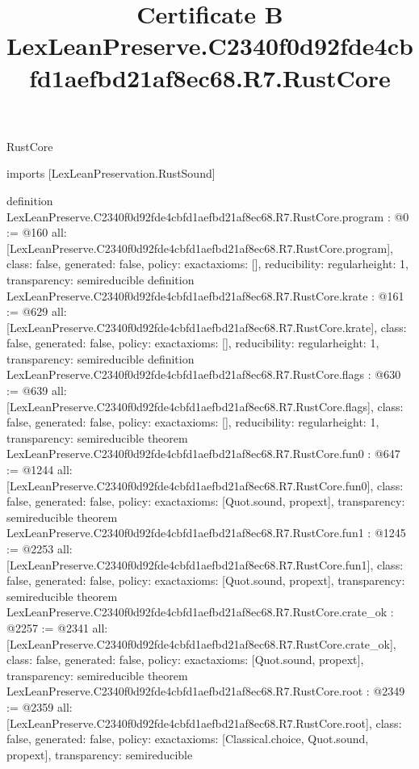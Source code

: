 \begin{lexlean}{RustCore}
\title{Certificate B LexLeanPreserve.C2340f0d92fde4cbfd1aefbd21af8ec68.R7.RustCore}
\begin{coremodule}
imports [LexLeanPreservation.RustSound]

definition LexLeanPreserve.C2340f0d92fde4cbfd1aefbd21af8ec68.R7.RustCore.program : @0 := @160 {
  all: [LexLeanPreserve.C2340f0d92fde4cbfd1aefbd21af8ec68.R7.RustCore.program],
  class: false,
  generated: false,
  policy: exact{axioms: []},
  reducibility: regular{height: 1},
  transparency: semireducible
}
definition LexLeanPreserve.C2340f0d92fde4cbfd1aefbd21af8ec68.R7.RustCore.krate : @161 := @629 {
  all: [LexLeanPreserve.C2340f0d92fde4cbfd1aefbd21af8ec68.R7.RustCore.krate],
  class: false,
  generated: false,
  policy: exact{axioms: []},
  reducibility: regular{height: 1},
  transparency: semireducible
}
definition LexLeanPreserve.C2340f0d92fde4cbfd1aefbd21af8ec68.R7.RustCore.flags : @630 := @639 {
  all: [LexLeanPreserve.C2340f0d92fde4cbfd1aefbd21af8ec68.R7.RustCore.flags],
  class: false,
  generated: false,
  policy: exact{axioms: []},
  reducibility: regular{height: 1},
  transparency: semireducible
}
theorem LexLeanPreserve.C2340f0d92fde4cbfd1aefbd21af8ec68.R7.RustCore.fun0 : @647 := @1244 {
  all: [LexLeanPreserve.C2340f0d92fde4cbfd1aefbd21af8ec68.R7.RustCore.fun0],
  class: false,
  generated: false,
  policy: exact{axioms: [Quot.sound, propext]},
  transparency: semireducible
}
theorem LexLeanPreserve.C2340f0d92fde4cbfd1aefbd21af8ec68.R7.RustCore.fun1 : @1245 := @2253 {
  all: [LexLeanPreserve.C2340f0d92fde4cbfd1aefbd21af8ec68.R7.RustCore.fun1],
  class: false,
  generated: false,
  policy: exact{axioms: [Quot.sound, propext]},
  transparency: semireducible
}
theorem LexLeanPreserve.C2340f0d92fde4cbfd1aefbd21af8ec68.R7.RustCore.crate_ok : @2257 := @2341 {
  all: [LexLeanPreserve.C2340f0d92fde4cbfd1aefbd21af8ec68.R7.RustCore.crate_ok],
  class: false,
  generated: false,
  policy: exact{axioms: [Quot.sound, propext]},
  transparency: semireducible
}
theorem LexLeanPreserve.C2340f0d92fde4cbfd1aefbd21af8ec68.R7.RustCore.root : @2349 := @2359 {
  all: [LexLeanPreserve.C2340f0d92fde4cbfd1aefbd21af8ec68.R7.RustCore.root],
  class: false,
  generated: false,
  policy: exact{axioms: [Classical.choice, Quot.sound, propext]},
  transparency: semireducible
}


\end{coremodule}
\end{lexlean}
